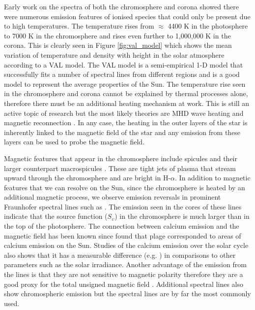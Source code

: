 Early work on the spectra of both the chromosphere and corona showed there were numerous emission features of ionised species that could only be present due to high temperatures. The temperature rises from $\approx$ 4400 K in the photosphere to 7000 K in the chromosphere and rises even further to 1,000,000 K in the corona. This is clearly seen in Figure \ref{fig:val_model} which shows the mean variation of temperature and density with height in the solar atmosphere according to a VAL model. The VAL model \citep{Vernazza_etal_1981} is a semi-empirical 1-D model that successfully fits a number of spectral lines from different regions and is a good model to represent the average properties of the Sun. The temperature rise seen in the chromosphere and corona cannot be explained by thermal processes alone, therefore there must be an additional heating mechanism at work. This is still an active topic of research but the most likely theories are MHD wave heating and magnetic reconnection \citep{Parnell_DeMoortel_2012}. In any case, the heating in the outer layers of the star is inherently linked to the magnetic field of the star and any emission from these layers can be used to probe the magnetic field. 

Magnetic features that appear in the chromosphere include spicules \citep{Roberts_1945} and their larger counterpart macrospicules \citep{Bohlin_etal_1975}. These are tight jets of plasma that stream upward through the chromosphere and are bright in H-$\alpha$. In addition to magnetic features that we can resolve on the Sun, since the chromosphere is heated by an additional magnetic process, we observe emission reversals in prominent Fraunhofer spectral lines such as \caII. The emission seen in the cores of these lines indicate that the source function ($S_{\upsilon}$) in the chromosphere is much larger than in the top of the photosphere. The connection between calcium emission and the magnetic field has been known since \citet{Leighton_1959} found that plage corresponded to areas of calcium emission on the Sun. Studies of the calcium emission over the solar cycle also shows that it has a measurable difference (e.g. \citealt{White_Livingston_1981}) in comparisons to other parameters such as the solar irradiance. Another advantage of the emission from the \caII lines is that they are not sensitive to magnetic polarity therefore they are a good proxy for the total unsigned magnetic field \citep{Linsky_Avrett_1970}. Additional spectral lines also show chromospheric emission but the \caII spectral lines are by far the most commonly used.

